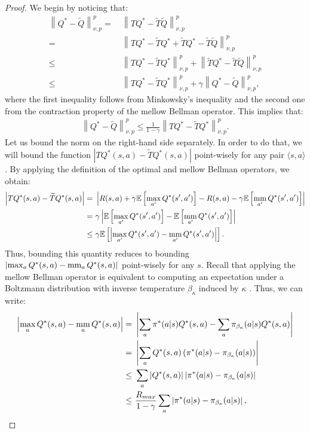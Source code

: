 \documentclass{article}
\newcommand{\mm}{\operatornamewithlimits{mm}}
\newcommand{\wt}[1]{\widetilde{#1}}
\newcommand{\norm}[1]{\left\lVert #1 \right\rVert}
\newcommand{\abs}[1]{\left\lvert #1 \right\rvert}
\begin{document}
\thmm*
\begin{proof}
We begin by noticing that:
\begin{align*}
\norm{Q^*-\wt{Q}}_{\nu,p}^p =\ & \norm{TQ^* - \wt{T}\wt{Q}}_{\nu,p}^p \\ =\ &
\norm{TQ^* - \wt{T}Q^* + \wt{T}Q^* - \wt{T}\wt{Q}}_{\nu,p}^p \\ \leq\ &
\norm{TQ^* - \wt{T}Q^*}_{\nu,p}^p + \norm{\wt{T}Q^* - \wt{T}\wt{Q}}_{\nu,p}^p \\ \leq\ &
\norm{TQ^* - \wt{T}Q^*}_{\nu,p}^p + \gamma\norm{Q^* - \wt{Q}}_{\nu,p}^p,
\end{align*}
where the first inequality follows from Minkowsky's inequality and the second one from the contraction property of the mellow Bellman operator. This implies that:
\begin{align} \label{eq:mm1}
\norm{Q^*-\wt{Q}}_{\nu,p}^p \leq \frac{1}{1-\gamma}\norm{TQ^* - \wt{T}Q^*}_{\nu,p}^p.
\end{align}
Let us bound the norm on the right-hand side separately. In order to do that, we will bound the function $\abs{TQ^*(s,a) - \wt{T}Q^*(s,a)}$ point-wisely for any pair $\langle s,a\rangle$. By applying the definition of the optimal and mellow Bellman operators, we obtain:
\begin{align} \label{eq:mm5}
\abs{TQ^*(s,a) - \wt{T}Q^*(s,a)} =\ & \abs{R(s,a) + \gamma\mathbb{E}\left[\max_{a'}Q^*(s',a')\right] - R(s,a) - \gamma\mathbb{E}\left[\mm_{a'}Q^*(s',a')\right]}\notag \\ =\ & \gamma\abs{\mathbb{E}\left[\max_{a'}Q^*(s',a')\right] - \mathbb{E}\left[\mm_{a'}Q^*(s',a')\right]}\notag \\ \leq\ & \gamma\mathbb{E}\left[\abs{\max_{a'}Q^*(s',a') - \mm_{a'}Q^*(s',a')}\right].
\end{align}
Thus, bounding this quantity reduces to bounding $\abs{\max_{a}Q^*(s,a) - \mm_{a}Q^*(s,a)}$ point-wisely for any $s$. Recall that applying the mellow Bellman operator is equivalent to computing an expectation under a Boltzmann distribution with inverse temperature $\beta_{\kappa}$ induced by $\kappa$ \cite{asadi2017alternative}. Thus, we can write:
\begin{align} \label{eq:mm2}
\abs{\max_a Q^*(s,a) - \mm_a Q^*(s,a)} =\ & \abs{\sum_a \pi^*(a|s)Q^*(s,a) - \sum_a \pi_{\beta_{\kappa}}(a|s)Q^*(s,a)}\notag\\ =\ & \abs{\sum_a Q^*(s,a) \left( \pi^*(a|s) - \pi_{\beta_{\kappa}}(a|s)  \right)}\notag\\ \leq\ & \sum_a \abs{Q^*(s,a)} \abs{\pi^*(a|s) - \pi_{\beta_{\kappa}}(a|s)}\notag\\ \leq\ & \frac{R_{max}}{1-\gamma}\sum_a\abs{\pi^*(a|s) - \pi_{\beta_{\kappa}}(a|s)},

\end{align}
\end{proof}
\end{document}
